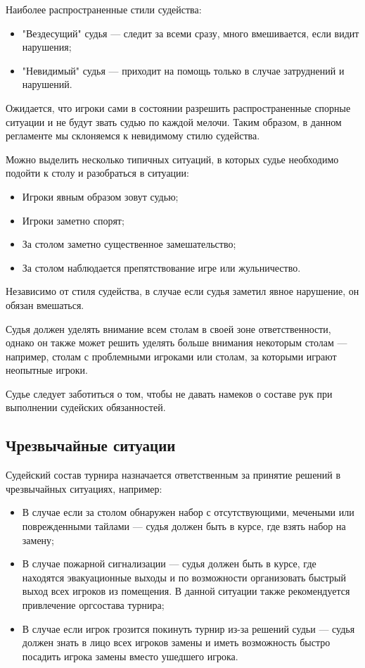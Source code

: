 Наиболее распространенные стили судейства:
\begin{itemize}
	\item "Вездесущий" судья --- следит за всеми сразу, много вмешивается, если видит нарушения;
	\item "Невидимый" судья --- приходит на помощь только в случае затруднений и нарушений.
\end{itemize}

Ожидается, что игроки сами в состоянии разрешить распространенные спорные ситуации и не будут звать судью по каждой мелочи. Таким образом, в данном регламенте мы склоняемся к невидимому стилю судейства.

Можно выделить несколько типичных ситуаций, в которых судье необходимо подойти к столу и разобраться в ситуации:
\begin{itemize}
	\item Игроки явным образом зовут судью;
	\item Игроки заметно спорят;
	\item За столом заметно существенное замешательство;
	\item За столом наблюдается препятствование игре или жульничество.
\end{itemize}

Независимо от стиля судейства, в случае если судья заметил явное нарушение, он обязан вмешаться.

Судья должен уделять внимание всем столам в своей зоне ответственности, однако он также может решить уделять больше внимания некоторым столам --- например, столам с проблемными игроками или столам, за которыми играют неопытные игроки.

Судье следует заботиться о том, чтобы не давать намеков о составе рук при выполнении судейских обязанностей.

\subsection{Чрезвычайные ситуации}

Судейский состав турнира назначается ответственным за принятие решений в чрезвычайных ситуациях, например:

\begin{itemize}
	\item В случае если за столом обнаружен набор с отсутствующими, мечеными или поврежденными тайлами --- судья должен быть в курсе, где взять набор на замену;
	\item В случае пожарной сигнализации --- судья должен быть в курсе, где находятся эвакуационные выходы и по возможности организовать быстрый выход всех игроков из помещения. В данной ситуации также рекомендуется привлечение оргсостава турнира;
	\item В случае если игрок грозится покинуть турнир из-за решений судьи --- судья должен знать в лицо всех игроков замены и иметь возможность быстро посадить игрока замены вместо ушедшего игрока.
\end{itemize}